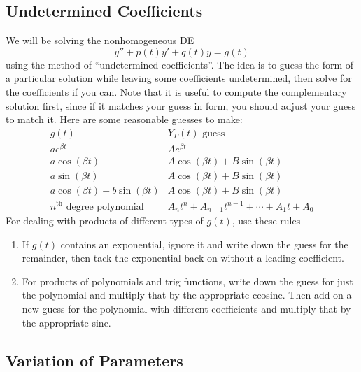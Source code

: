 \documentclass[12pt]{article}
\theoremstyle{definition}
\begin{document}
\subsection{Undetermined Coefficients}
We will be solving the nonhomogeneous DE \begin{equation*}
	y'' + p(t)y' + q(t)y = g(t)
\end{equation*}
using the method of ``undetermined coefficients''.
The idea is to guess the form of a particular solution while leaving some coefficients undetermined, then solve for the coefficients if you can.
Note that it is useful to compute the complementary solution first, since if it matches your guess in form, you should adjust your guess to match it.
Here are some reasonable guesses to make: \begin{equation*}
	\begin{array}{c|c}
		g(t)                                     & \text{$Y_P(t)$ guess}                           \\
		\hline
		ae^{\beta t}                             & Ae^{\beta t}                                    \\
		a\cos(\beta t)                           & A\cos(\beta t) + B\sin(\beta t)                 \\
		a\sin(\beta t)                           & A\cos(\beta t) + B\sin(\beta t)                 \\
		a\cos(\beta t) + b\sin(\beta t)          & A\cos(\beta t) + B\sin(\beta t)                 \\
		\text{$n^{\text{th}}$ degree polynomial} & A_n t^n + A_{n-1}t^{n-1} + \cdots + A_1 t + A_0
	\end{array}
\end{equation*}
For dealing with products of different types of $g(t)$, use these rules \begin{enumerate}
  \item If $g(t)$ contains an exponential, ignore it and write down the guess for the remainder, then tack the exponential back on without a leading coefficient.
  \item For products of polynomials and trig functions, write down the guess for just the polynomial and multiply that by the appropriate ccosine. Then add on a new guess for the polynomial with different coefficients and multiply that by the appropriate sine.
\end{enumerate}

\subsection{Variation of Parameters}
\end{document}

